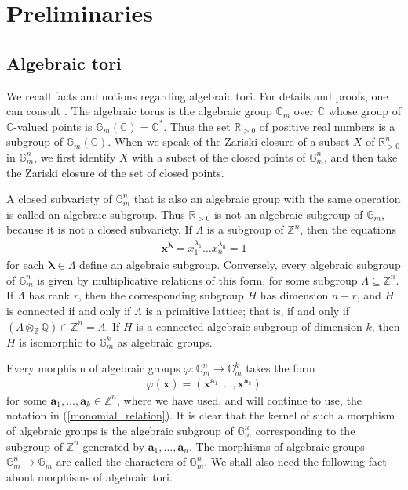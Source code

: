 \documentclass[9pt]{amsart}
\theoremstyle{my_theorem_style}
\numberwithin{definition}{section}
\newcommand{\C}{\mathbb{C}}
\newcommand{\G}{\mathbb{G}}
\renewcommand{\phi}{\varphi}
\newcommand{\Q}{\mathbb{Q}}
\newcommand{\R}{\mathbb{R}}
\renewcommand{\vec}[1]{\bm{#1}}
\newcommand{\Z}{\mathbb{Z}}
\begin{document}
% 

\section{Preliminaries}
\label{preliminaries}

\subsection{Algebraic tori}

We recall facts and notions regarding algebraic tori. For details and proofs, one can consult \cite[Chapter 3]{Bombieri--Gubler_heights_in_Diophantine_geometry}. The algebraic torus is the algebraic group $\G_m$ over $\C$ whose group of $\C$-valued points is $\G_m(\C) = \C^\ast$. Thus the set $\R_{>0}$ of positive real numbers is a subgroup of $\G_m(\C)$. When we speak of the Zariski closure of a subset $X$ of $\R_{>0}^n$ in $\G_m^n$, we first identify $X$ with a subset of the closed points of $\G_m^n$, and then take the Zariski closure of the set of closed points.

A closed subvariety of $\G_m^n$ that is also an algebraic group with the same operation is called an algebraic subgroup. Thus $\R_{>0}$ is not an algebraic subgroup of $\G_m$, because it is not a closed subvariety. If $\Lambda$ is a subgroup of $\Z^n$, then the equations
\begin{align}
\label{monomial_relation}
    \vec{x}^{\vec{\lambda}} = x_1^{\lambda_1} \dots x_n^{\lambda_n} = 1
\end{align}
for each $\vec{\lambda} \in \Lambda$ define an algebraic subgroup. Conversely, every algebraic subgroup of $\G_m^n$ is given by multiplicative relations of this form, for some subgroup $\Lambda \subseteq \Z^n$. If $\Lambda$ has rank $r$, then the corresponding subgroup $H$ has dimension $n - r$, and $H$ is connected if and only if $\Lambda$ is a primitive lattice; that is, if and only if $(\Lambda \otimes_{\Z} \Q) \cap \Z^n = \Lambda$. If $H$ is a connected algebraic subgroup of dimension $k$, then $H$ is isomorphic to $\G_m^k$ as algebraic groups. 

Every morphism of algebraic groups $\phi : \G_m^n \to \G_m^k$ takes the form
\begin{align*}
    \phi(\vec{x}) = (\vec{x}^{\vec{a}_1}, \dots, \vec{x}^{\vec{a}_k})
\end{align*}
for some $\vec{a}_1, \dots, \vec{a}_k \in \Z^n$, where we have used, and will continue to use, the notation in (\ref{monomial_relation}). It is clear that the kernel of such a morphism of algebraic groups is the algebraic subgroup of $\G_m^n$ corresponding to the subgroup of $\Z^n$ generated by $\vec{a}_1, \dots, \vec{a}_n$. The morphisms of algebraic groups $\G_m^n \to \G_m$ are called the characters of $\G_m^n$. We shall also need the following fact about morphisms of algebraic tori.
\end{document}
